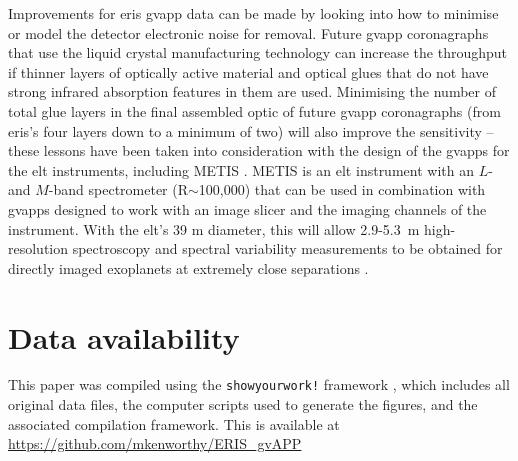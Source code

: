 \documentclass{aa}
\begin{document}
Improvements for \ac{eris} \ac{gvapp} data can be made by looking into how to minimise or model the detector electronic noise for removal.
%
Future \ac{gvapp} coronagraphs that use the liquid crystal manufacturing technology can increase the throughput if thinner layers of optically active material and optical glues that do not have strong infrared absorption features in them are used.
%
Minimising the number of total glue layers in the final assembled optic of future \ac{gvapp} coronagraphs (from \ac{eris}'s four layers down to a minimum of two) will also improve the sensitivity -- these lessons have been taken into consideration with the design of the \acp{gvapp} \citep{2024SPIE13096E..52A} for the \ac{elt} instruments, including METIS \citep{2021Msngr.182...22B}.
%
METIS is an \ac{elt} instrument with an $L$- and $M$-band spectrometer (R$\sim$100,000) that can be used in combination with \acp{gvapp} designed to work with an image slicer and the imaging channels of the instrument.
%
With the \ac{elt}'s 39 m diameter, this will allow 2.9-5.3~\textmu m high-resolution spectroscopy and spectral variability measurements to be obtained for directly imaged exoplanets at extremely close separations \citep[e.g.][]{2014Natur.509...63S, 2015A&A...576A..59S, 2023MNRAS.520.4235S, 2025MNRAS.544.3191S, 2024MNRAS.531.2356P, 2025MNRAS.537..134G}.

\section*{Data availability}

 This paper was compiled using the {\tt showyourwork!} framework \citep{Luger2021}, which includes all original data files, the computer scripts used to generate the figures, and the associated compilation framework.
 This is available at \url{https://github.com/mkenworthy/ERIS_gvAPP}
 
\end{document}
